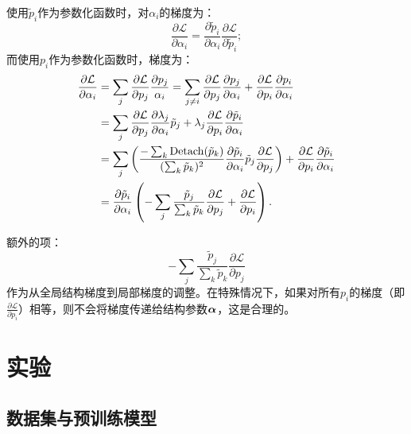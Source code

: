 使用$\tilde{p}_i$作为参数化函数时，对$\alpha_i$的梯度为：
\begin{equation}
\frac{\partial {\mathcal{L}}}{\partial \alpha_i} = \frac{\partial{\tilde{p}}_i}{\partial{\alpha_i}}\frac{\partial{{\mathcal{L}}}}{\partial{\tilde{p}_i}};
\end{equation}
而使用$p_i$作为参数化函数时，梯度为：
\begin{align}
\frac{\partial {\mathcal{L}}}{\partial \alpha_i} & = \sum_j \frac{\partial {\mathcal{L}}}{\partial{p}_j} \frac{\partial{p_j}}{\alpha_i} = \sum_{j\neq i} \frac{\partial {\mathcal{L}}}{\partial{p}_j} \frac{\partial{p_j}}{\partial\alpha_i} + \frac{\partial {\mathcal{L}}}{\partial{p}_i} \frac{\partial{p_i}}{\partial\alpha_i} \\ 
& = \sum_{j} \frac{\partial{{\mathcal{L}}}}{\partial p_j}\frac{\partial\lambda_j}{\partial \alpha_i} \tilde{p}_j + \lambda_j \frac{\partial{{\mathcal{L}}}}{\partial p_i}\frac{\partial\tilde{p}_i}{\partial{\alpha_i}} \\
& = \sum_{j}\left(\frac{-\sum_k\operatorname{Detach}(\Tilde{p}_k)}{(\sum_k \Tilde{p}_k)^2}\frac{\partial{\tilde{p}_i}}{\partial{\alpha_i}}\Tilde{p}_j\frac{\partial{{\mathcal{L}}}}{\partial{p}_j}\right) + \frac{\partial{{\mathcal{L}}}}{\partial p_i}\frac{\partial\tilde{p}_i}{\partial{\alpha_i}}  \\
& = \frac{\partial\tilde{p}_i}{\partial{\alpha_i}} \left(-\sum_j\frac{\tilde{p}_j}{\sum_k{\tilde{p}_k}}\frac{\partial{{\mathcal{L}}}}{\partial{p_j}} + \frac{\partial{{\mathcal{L}}}}{\partial{p_i}}\right).
\end{align}

额外的项：
\begin{equation}
    -\sum_j\frac{\tilde{p}_j}{\sum_k{\tilde{p}_k}}\frac{\partial{{\mathcal{L}}}}{\partial{{p}_j}} 
\end{equation}
作为从全局结构梯度到局部梯度的调整。在特殊情况下，如果对所有$p_i$的梯度（即$\frac{\partial{{\mathcal{L}}}}{\partial{{p}_i}}$）相等，则不会将梯度传递给结构参数$\boldsymbol{\alpha}$，这是合理的。




\section{实验}

\subsection{数据集与预训练模型}

